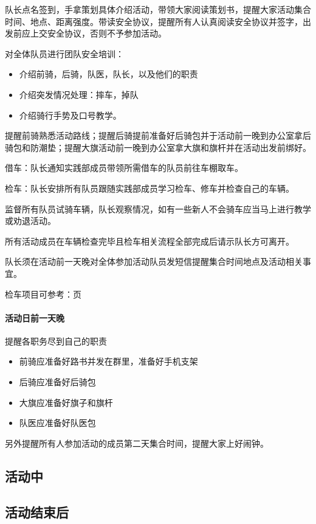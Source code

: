 \documentclass{ctexbook}
\begin{document}
队长点名签到，手拿策划具体介绍活动，带领大家阅读策划书，提醒大家活动集合时间、地点、距离强度。带读安全协议，提醒所有人认真阅读安全协议并签字，出发前应上交安全协议，否则不予参加活动。

对全体队员进行团队安全培训：
\begin{itemize}
    \item 介绍前骑，后骑，队医，队长，以及他们的职责
    \item 介绍突发情况处理：摔车，掉队
    \item 介绍骑行手势及口号教学。
\end{itemize}

提醒前骑熟悉活动路线；提醒后骑提前准备好后骑包并于活动前一晚到办公室拿后骑包和防潮垫；提醒大旗活动前一晚到办公室拿大旗和旗杆并在活动出发前绑好。

借车：队长通知实践部成员带领所需借车的队员前往车棚取车。

检车：队长安排所有队员跟随实践部成员学习检车、修车并检查自己的车辆。

监督所有队员试骑车辆，队长观察情况，如有一些新人不会骑车应当马上进行教学或劝退活动。

所有活动成员在车辆检查完毕且检车相关流程全部完成后请示队长方可离开。

队长须在活动前一天晚对全体参加活动队员发短信提醒集合时间地点及活动相关事宜。

检车项目可参考：\pageref{sec:检车}页
\paragraph{活动日前一天晚}

提醒各职务尽到自己的职责

\begin{itemize}
    \item 前骑应准备好路书并发在群里，准备好手机支架
    \item 后骑应准备好后骑包
    \item 大旗应准备好旗子和旗杆
    \item 队医应准备好队医包
\end{itemize}

另外提醒所有人参加活动的成员第二天集合时间，提醒大家上好闹钟。
\subsection{活动中}
\subsection{活动结束后}
\end{document}
